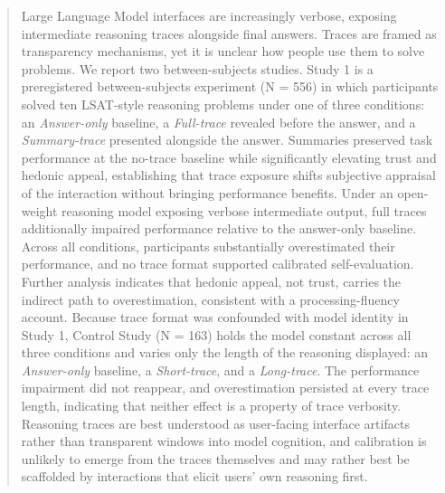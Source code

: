 \documentclass[manuscript,review,anonymous]{acmart}
\let\xtodo\todo
\renewcommand{\todo}[1]{\xtodo[inline,color=green!50]{#1}}
\begin{document}
\begin{abstract}

Large Language Model interfaces are increasingly verbose, exposing intermediate reasoning traces alongside final answers. Traces are framed as transparency mechanisms, yet it is unclear how people use them to solve problems. We report two between-subjects studies. Study 1 is a preregistered between-subjects experiment (N = 556) in which participants solved ten LSAT-style reasoning problems under one of three conditions: an \textit{Answer-only} baseline, a \textit{Full-trace} revealed before the answer, and a \textit{Summary-trace} presented alongside the answer. Summaries preserved task performance at the no-trace baseline while significantly elevating trust and hedonic appeal, establishing that trace exposure shifts subjective appraisal of the interaction without bringing performance benefits. Under an open-weight reasoning model exposing verbose intermediate output, full traces additionally impaired performance relative to the answer-only baseline. Across all conditions, participants substantially overestimated their performance, and no trace format supported calibrated self-evaluation. Further analysis indicates that hedonic appeal, not trust, carries the indirect path to overestimation, consistent with a processing-fluency account. Because trace format was confounded with model identity in Study 1, Control Study (N = 163) holds the model constant across all three conditions and varies only the length of the reasoning displayed: an \textit{Answer-only} baseline, a \textit{Short-trace}, and a \textit{Long-trace}. The performance impairment did not reappear, and overestimation persisted at every trace length, indicating that neither effect is a property of trace verbosity. Reasoning traces are best understood as user-facing interface artifacts rather than transparent windows into model cognition, and calibration is unlikely to emerge from the traces themselves and may rather best be scaffolded by interactions that elicit users' own reasoning first.



\end{abstract}
\end{document}
